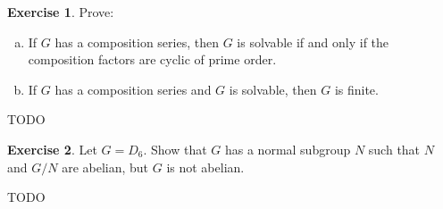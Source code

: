 \documentclass[11pt,oneside]{article}
\numberwithin{equation}{section}
\theoremstyle{definition}
\newtheorem{exercise}{Exercise}
\begin{document}
\begin{exercise}
  Prove:
  
  \begin{enumerate}[(a)]
  \item
    If $G$ has a composition series, then $G$ is solvable if and only if the composition factors are
    cyclic of prime order.
  \item
    If $G$ has a composition series and $G$ is solvable, then $G$ is finite.  
  \end{enumerate}
\end{exercise}

\begin{solution}
  TODO
\end{solution}

\begin{exercise}
  Let $G = D_6$.  Show that $G$ has a normal subgroup $N$ such that $N$ and $G/N$ are abelian,
  but $G$ is not abelian.  
\end{exercise}
\begin{solution}
  TODO
\end{solution}

\begin{comment}
  \begin{exercise}
    problem
  \end{exercise}
  \begin{solution}
    \begin{enumerate}[(a)]
    \item
      first answer
    \end{enumerate}
  \end{solution}
\end{comment}
\end{document}
